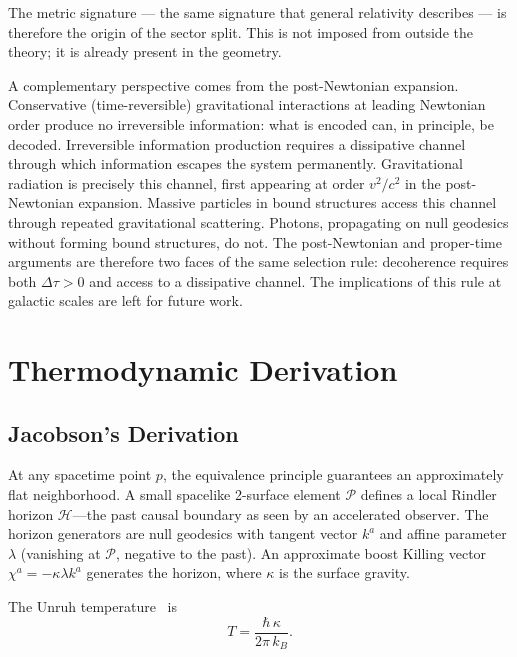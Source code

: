 \documentclass[twocolumn,a4paper,aps,prd,twocolumn,showpacs,notitlepage,superscriptaddress,nofootinbib]{article}
\begin{document}
The metric signature — the same signature that general relativity describes —
is therefore the origin of the sector split.  This is not imposed from outside
the theory; it is already present in the geometry.

A complementary perspective comes from the post-Newtonian expansion.
Conservative (time-reversible) gravitational interactions at leading Newtonian
order produce no irreversible information: what is encoded can, in principle,
be decoded.  Irreversible information production requires a dissipative channel
through which information escapes the system permanently.  Gravitational
radiation is precisely this channel, first appearing at order $v^2/c^2$ in the
post-Newtonian expansion.  Massive particles in bound structures access this
channel through repeated gravitational scattering.  Photons, propagating on
null geodesics without forming bound structures, do not.  The post-Newtonian
and proper-time arguments are therefore two faces of the same selection rule:
decoherence requires both $\Delta\tau > 0$ and access to a dissipative
channel.  The implications of this rule at galactic scales are left for future work.

\section{Thermodynamic Derivation}
\label{sec:derivation}

\subsection{Jacobson's Derivation}

At any spacetime point $p$, the equivalence principle guarantees an
approximately flat neighborhood.  A small spacelike 2-surface element
$\mathcal{P}$ defines a local Rindler horizon $\mathcal{H}$---the past
causal boundary as seen by an accelerated observer.  The horizon generators
are null geodesics with tangent vector $k^a$ and affine parameter $\lambda$
(vanishing at $\mathcal{P}$, negative to the past).  An approximate boost
Killing vector $\chi^a = -\kappa\lambda k^a$ generates the horizon, where
$\kappa$ is the surface gravity.

The Unruh temperature~\citep{Unruh1976} is
\begin{equation}
T = \frac{\hbar\,\kappa}{2\pi\,k_B}.
\label{eq:unruh}
\end{equation}
\end{document}
